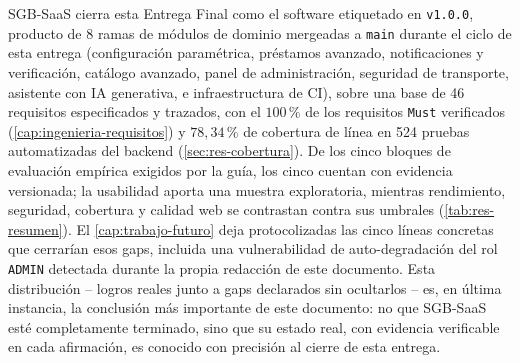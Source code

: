 SGB-SaaS cierra esta Entrega Final como el software etiquetado en \texttt{v1.0.0}, producto de 8 ramas de
módulos de dominio mergeadas a \texttt{main} durante el ciclo de esta
entrega (configuración paramétrica, préstamos avanzado, notificaciones y
verificación, catálogo avanzado, panel de administración, seguridad de
transporte, asistente con IA generativa, e infraestructura de CI), sobre
una base de 46 requisitos especificados y trazados, con el $100$\,\% de
los requisitos \texttt{Must} verificados
(\autoref{cap:ingenieria-requisitos}) y $78{,}34$\,\% de cobertura de
línea en 524 pruebas automatizadas del backend
(\autoref{sec:res-cobertura}). De los cinco bloques de evaluación
empírica exigidos por la guía, los cinco cuentan con evidencia versionada;
la usabilidad aporta una muestra exploratoria, mientras rendimiento,
seguridad, cobertura y calidad web se contrastan contra sus umbrales
(\autoref{tab:res-resumen}). El \autoref{cap:trabajo-futuro} deja
protocolizadas las cinco líneas concretas que cerrarían esos gaps, incluida
una vulnerabilidad de auto-degradación del rol \texttt{ADMIN} detectada
durante la propia redacción de este documento. Esta distribución -- logros
reales junto a gaps declarados sin ocultarlos -- es, en última instancia,
la conclusión más importante de este documento: no que SGB-SaaS esté
completamente terminado, sino que su estado real, con evidencia
verificable en cada afirmación, es conocido con precisión al cierre de
esta entrega.
